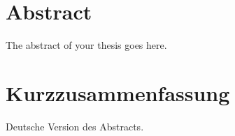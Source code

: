 \section{Abstract}
The abstract of your thesis goes here.

\lipsum[1-2]

\section{Kurzzusammenfassung}

Deutsche Version des Abstracts.

\lipsum[1-2]